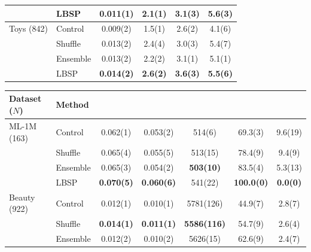 \begin{table}[!htbp]
\begin{tabular*}{\textwidth}{@{\extracolsep{\fill}}llS[table-format=1.3(3)]S[table-format=2.1(3)]S[table-format=2.1(3)]S[table-format=2.1(3)]@{}}
 & LBSP & 0.011(1) & 2.1(1) & 3.1(3) & 5.6(3)\\ %
\midrule
Toys (842) & Control & 0.009(2) & 1.5(1) & 2.6(2) & 4.1(6)\\ %
 & Shuffle & 0.013(2) & 2.4(4) & 3.0(3) & 5.4(7)\\ %
 & Ensemble & 0.013(2) & 2.2(2) & 3.1(1) & 5.1(1)\\ %
 & LBSP & \bfseries 0.014(2) & \bfseries 2.6(2) & \bfseries 3.6(3) & \bfseries 5.5(6)\\ %
\bottomrule
\end{tabular*}
\par\smallskip\noindent{}\par\smallskip
\noindent\begin{tabular*}{\textwidth}{@{\extracolsep{\fill}}llS[table-format=1.3(3)]S[table-format=1.3(3)]S[table-format=5.0(5)]S[table-format=3.1(3)]S[table-format=2.1(3)]@{}}
\toprule
{Dataset ($N$)} & Method & {} & {} & {} & {} & {}\\
\midrule
ML-1M (163) & Control & 0.062(1) & 0.053(2) & 514(6) & 69.3(3) & 9.6(19)\\ %
 & Shuffle & 0.065(4) & 0.055(5) & 513(15) & 78.4(9) & 9.4(9)\\ %
 & Ensemble & 0.065(3) & 0.054(2) & \bfseries 503(10) & 83.5(4) & 5.3(13)\\ %
 & LBSP & \bfseries 0.070(5) & \bfseries 0.060(6) & 541(22) & \bfseries 100.0(0) & \bfseries 0.0(0)\\ %
\midrule
Beauty (922) & Control & 0.012(1) & 0.010(1) & 5781(126) & 44.9(7) & 2.8(7)\\ %
 & Shuffle & \bfseries 0.014(1) & \bfseries 0.011(1) & \bfseries 5586(116) & 54.7(9) & 2.6(4)\\ %
 & Ensemble & 0.012(2) & 0.010(2) & 5626(15) & 62.6(9) & 2.4(7)\\ %

\end{tabular*}
\end{table}
